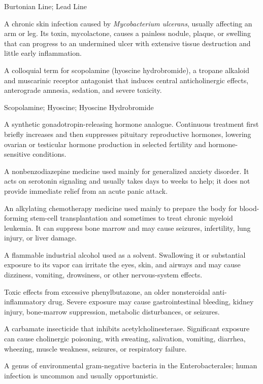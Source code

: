 \synonyms
Burtonian Line; Lead Line

 A chronic skin infection caused by \textit{Mycobacterium
ulcerans}, usually affecting an arm or leg. Its toxin, mycolactone, causes a
painless nodule, plaque, or swelling that can progress to an undermined ulcer
with extensive tissue destruction and little early inflammation.

 A colloquial term for scopolamine (hyoscine hydrobromide), a tropane alkaloid and muscarinic receptor antagonist that induces central anticholinergic effects, anterograde amnesia, sedation, and severe toxicity.

\synonyms
Scopolamine; Hyoscine; Hyoscine Hydrobromide

 A synthetic gonadotropin-releasing hormone analogue. Continuous treatment first briefly increases and then suppresses pituitary reproductive hormones, lowering ovarian or testicular hormone production in selected fertility and hormone-sensitive conditions.

 A nonbenzodiazepine medicine used mainly for generalized anxiety disorder. It acts on serotonin signaling and usually takes days to weeks to help; it does not provide immediate relief from an acute panic attack.

 An alkylating chemotherapy medicine used mainly to prepare the body for blood-forming stem-cell transplantation and sometimes to treat chronic myeloid leukemia. It can suppress bone marrow and may cause seizures, infertility, lung injury, or liver damage.

 A flammable industrial alcohol used as a solvent. Swallowing it or substantial exposure to its vapor can irritate the eyes, skin, and airways and may cause dizziness, vomiting, drowsiness, or other nervous-system effects.

 Toxic effects from excessive phenylbutazone, an older nonsteroidal anti-inflammatory drug. Severe exposure may cause gastrointestinal bleeding, kidney injury, bone-marrow suppression, metabolic disturbances, or seizures.

 A carbamate insecticide that inhibits acetylcholinesterase. Significant exposure can cause cholinergic poisoning, with sweating, salivation, vomiting, diarrhea, wheezing, muscle weakness, seizures, or respiratory failure.

 A genus of environmental gram-negative bacteria in the Enterobacterales; human infection is uncommon and usually opportunistic.

